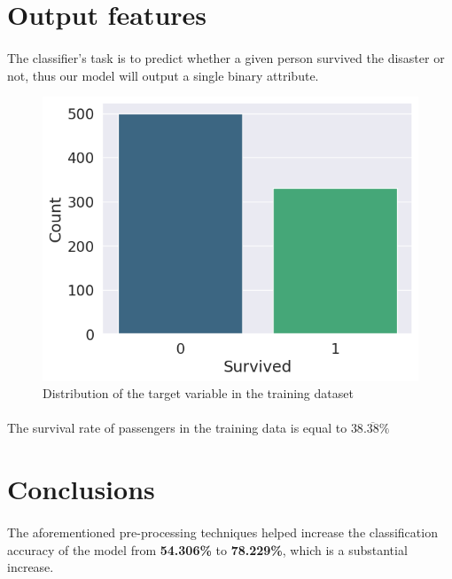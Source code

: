 \documentclass{article}
\begin{document}
\section{Output features}
\paragraph{}The classifier's task is to predict whether a given person survived the disaster or not, thus our model will output a single binary attribute.
\begin{figure}[htb]
    \centering
    \includegraphics[width=0.85\linewidth]{target_distribution.png}
    \caption{Distribution of the target variable in the training dataset}
    \label{fig:enter-label}
\end{figure}
\paragraph{}The survival rate of passengers in the training data is equal to $38.\overline{38}\%$
\section{Conclusions}
\paragraph{}The aforementioned pre-processing techniques helped increase the classification accuracy of the model from \textbf{54.306\%} to \textbf{78.229\%}, which is a substantial increase. 
\end{document}
